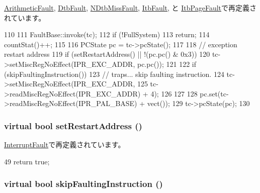 \hyperlink{classAlphaISA_1_1ArithmeticFault_a2bd783b42262278d41157d428e1f8d6f}{ArithmeticFault}, \hyperlink{classAlphaISA_1_1DtbFault_a2bd783b42262278d41157d428e1f8d6f}{DtbFault}, \hyperlink{classAlphaISA_1_1NDtbMissFault_a2bd783b42262278d41157d428e1f8d6f}{NDtbMissFault}, \hyperlink{classAlphaISA_1_1ItbFault_a2bd783b42262278d41157d428e1f8d6f}{ItbFault}, と \hyperlink{classAlphaISA_1_1ItbPageFault_a2bd783b42262278d41157d428e1f8d6f}{ItbPageFault}で再定義されています。


\begin{DoxyCode}
110 {
111     FaultBase::invoke(tc);
112     if (!FullSystem)
113         return;
114     countStat()++;
115 
116     PCState pc = tc->pcState();
117 
118     // exception restart address
119     if (setRestartAddress() || !(pc.pc() & 0x3))
120         tc->setMiscRegNoEffect(IPR_EXC_ADDR, pc.pc());
121 
122     if (skipFaultingInstruction()) {
123         // traps...  skip faulting instruction.
124         tc->setMiscRegNoEffect(IPR_EXC_ADDR,
125                    tc->readMiscRegNoEffect(IPR_EXC_ADDR) + 4);
126     }
127 
128     pc.set(tc->readMiscRegNoEffect(IPR_PAL_BASE) + vect());
129     tc->pcState(pc);
130 }
\end{DoxyCode}
\hypertarget{classAlphaISA_1_1AlphaFault_a5187b0d322a9546c3eb0ce51f3268f4e}{
\subsubsection[{setRestartAddress}]{\setlength{\rightskip}{0pt plus 5cm}virtual bool setRestartAddress ()}}
\label{classAlphaISA_1_1AlphaFault_a5187b0d322a9546c3eb0ce51f3268f4e}


\hyperlink{classAlphaISA_1_1InterruptFault_a92cd7f56a5213322fd8b3d1dbe9a7136}{InterruptFault}で再定義されています。


\begin{DoxyCode}
49 {return true;}
\end{DoxyCode}
\hypertarget{classAlphaISA_1_1AlphaFault_a5d44c6b9ce6041b3e9235e8d978156cb}{
\subsubsection[{skipFaultingInstruction}]{\setlength{\rightskip}{0pt plus 5cm}virtual bool skipFaultingInstruction ()}}
\label{classAlphaISA_1_1AlphaFault_a5d44c6b9ce6041b3e9235e8d978156cb}


